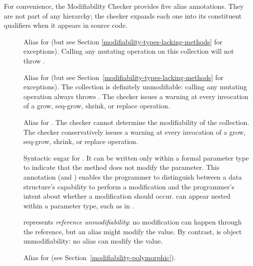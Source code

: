 
For convenience, the Modifiability Checker provides five alias
annotations.  They are not part of any hierarchy; the checker expands
each one into its constituent qualifiers when it appears in source code.

\begin{description}

\item[]
Alias for  (but see
Section \ref{modifiability-types-lacking-methods} for exceptions).  Calling
any mutating operation on this collection will not throw
\UnsupportedOperationException.

\item[]
Alias for  (but see
Section~\ref{modifiability-types-lacking-methods} for exceptions).  The
collection is definitely unmodifiable: calling any mutating operation
always throws \UnsupportedOperationException.  The checker issues a warning
at every invocation of a grow, seq-grow, shrink, or replace operation.

\item[]
Alias for .
The checker cannot determine the modifiability of the collection.
The checker conservatively issues a warning at every invocation of a grow,
seq-grow, shrink, or replace operation.

\item[]
Syntactic sugar for .
It can be written only within a formal parameter type to indicate that the
method does not modify the parameter.  This annotation (and
) enables the
programmer to distinguish between a data structure's capability to perform
a modification and the programmer's intent about whether a modification
should occur.
can appear nested within a parameter type, such as in
.

 represents
\emph{reference unmodifiability}:  no modification can happen through the
reference, but an alias might modify the value.  By contrast,
 is object
unmodifiability:  no alias can modify the value.

\item[]
Alias for 
(see Section~\ref{modifiability-polymorphic}).

\end{description}

